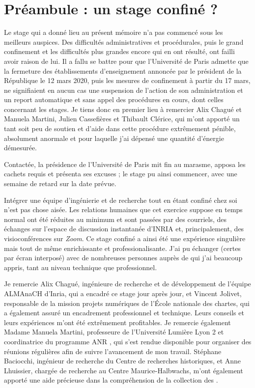 \section*{Préambule : un stage confiné ?}

Le stage qui a donné lieu au présent mémoire n'a pas commencé sous les meilleurs auspices. Des difficultés administratives et procédurales, puis le grand confinement et les difficultés plus grandes encore qui en ont résulté, ont failli avoir raison de lui. Il a fallu se battre pour que l'Université de Paris admette que la fermeture des établissements d'enseignement annoncée par le président de la République le 12 mars 2020, puis les mesures de confinement à partir du 17 mars, ne signifiaient en aucun cas une suspension de l'action de son administration et un report automatique et sans appel des procédures en cours, dont celles concernant les stages. Je tiens donc en premier lieu à remercier Alix Chagué et Manuela Martini, Julien Cassefières et Thibault Clérice, qui m'ont apporté un tant soit peu de soutien et d'aide dans cette procédure extrêmement pénible, absolument anormale et pour laquelle j'ai dépensé une quantité d'énergie démesurée.

Contactée, la présidence de l'Université de Paris mit fin au marasme, apposa les cachets requis et présenta ses excuses ; le stage pu ainsi commencer, avec une semaine de retard sur la date prévue.

Intégrer une équipe d'ingénierie et de recherche tout en étant confiné chez soi n'est pas chose aisée. Les relations humaines que cet exercice suppose en temps normal ont été réduites au minimum et sont passées par des courriels, des échanges sur l'espace de discussion instantanée d'INRIA et, principalement, des visioconférences sur \textit{Zoom}. Ce stage confiné a ainsi été une expérience singulière mais tout de même enrichissante et professionalisante. J'ai pu échanger (certes par écran interposé) avec de nombreuses personnes auprès de qui j'ai beaucoup appris, tant au niveau technique que professionnel.

Je remercie Alix Chagué, ingénieure de recherche et de développement de l'équipe ALMAnaCH d'Inria, qui a encadré ce stage jour après jour, et Vincent Jolivet, responsable de la mission projets numériques de l'École nationale des chartes, qui a également assuré un encadrement professionnel et technique. Leurs conseils et leurs expériences m'ont été extrêmement profitables. Je remercie également Madame Manuela Martini, professeure de l'Université Lumière Lyon 2 et coordinatrice du programme ANR \timeus{}, qui s'est rendue disponible pour organiser des réunions régulières afin de suivre l'avancement de mon travail. Stéphane Baciocchi, ingénieur de recherche du Centre de recherches historiques, et Anne Lhuissier, chargée de recherche au Centre Maurice-Halbwachs, m'ont également apporté une aide précieuse dans la compréhension de la collection des \odm.


